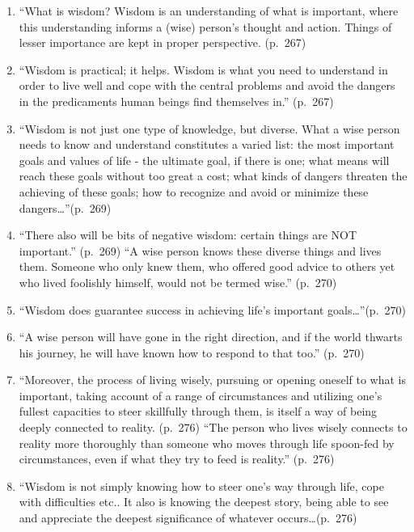 \documentclass[
]{book}
\providecommand{\tightlist}{%
  \setlength{\itemsep}{0pt}\setlength{\parskip}{0pt}}
\begin{document}
\begin{enumerate}
\def\labelenumi{\arabic{enumi}.}
\tightlist
\item
  ``What is wisdom? Wisdom is an understanding of what is important, where this understanding informs a (wise) person's thought and action. Things of lesser importance are kept in proper perspective. (p.~267)
\item
  ``Wisdom is practical; it helps. Wisdom is what you need to understand in order to live well and cope with the central problems and avoid the dangers in the predicaments human beings find themselves in.'' (p.~267)
\item
  ``Wisdom is not just one type of knowledge, but diverse. What a wise person needs to know and understand constitutes a varied list: the most important goals and values of life - the ultimate goal, if there is one; what means will reach these goals without too great a cost; what kinds of dangers threaten the achieving of these goals; how to recognize and avoid or minimize these dangers\ldots{}''(p.~269)
\item
  ``There also will be bits of negative wisdom: certain things are NOT important.'' (p.~269)
  ``A wise person knows these diverse things and lives them. Someone who only knew them, who offered good advice to others yet who lived foolishly himself, would not be termed wise.'' (p.~270)
\item
  ``Wisdom does guarantee success in achieving life's important goals\ldots{}''(p.~270)
\item
  ``A wise person will have gone in the right direction, and if the world thwarts his journey, he will have known how to respond to that too.'' (p.~270)
\item
  ``Moreover, the process of living wisely, pursuing or opening oneself to what is important, taking account of a range of circumstances and utilizing one's fullest capacities to steer skillfully through them, is itself a way of being deeply connected to reality. (p.~276)
  ``The person who lives wisely connects to reality more thoroughly than someone who moves through life spoon-fed by circumstances, even if what they try to feed is reality.'' (p.~276)
\item
  ``Wisdom is not simply knowing how to steer one's way through life, cope with difficulties etc.. It also is knowing the deepest story, being able to see and appreciate the deepest significance of whatever occurs\ldots(p.~276)
\end{enumerate}
\end{document}
